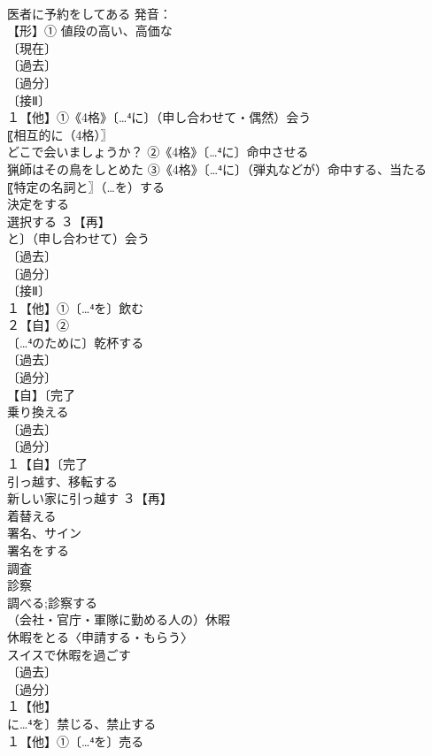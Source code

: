 \documentclass[8pt]{extreport}
\begin{document}
\begin{CJK}{UTF8}{min}
\\	医者に予約をしてある 発音：
\\	【形】① 値段の高い、高価な
\\	〔現在〕
\\	〔過去〕
\\	〔過分〕
\\	〔接Ⅱ〕
\\	１【他】①《4格》〔…⁴に〕（申し合わせて・偶然）会う 
\\	〖相互的に（4格）〗
\\	どこで会いましょうか？ ②《4格》〔…⁴に〕命中させる　
\\	猟師はその鳥をしとめた ③《4格》〔…⁴に〕（弾丸などが）命中する、当たる 
\\	〖特定の名詞と〗（…を）する 
\\	決定をする　
\\	選択する ３【再】
\\	と〕（申し合わせて）会う
\\	〔過去〕
\\	〔過分〕
\\	〔接Ⅱ〕
\\	１【他】①〔…⁴を〕飲む 
\\	２【自】②
\\	〔…⁴のために〕乾杯する 
\\	〔過去〕
\\	〔過分〕
\\	【自】〔完了
\\	乗り換える 
\\	〔過去〕
\\	〔過分〕
\\	１【自】〔完了
\\	引っ越す、移転する 
\\	新しい家に引っ越す ３【再】
\\	着替える
\\	署名、サイン
\\	署名をする
\\	調査　
\\	診察 
\\	調べる;診察する
\\	（会社・官庁・軍隊に勤める人の）休暇
\\	休暇をとる〈申請する・もらう〉 
\\	スイスで休暇を過ごす 
\\	〔過去〕
\\	〔過分〕
\\	１【他】
\\	に…⁴を〕禁じる、禁止する
\\	１【他】①〔…⁴を〕売る

\end{CJK}
\end{document}
